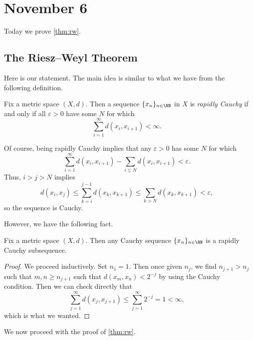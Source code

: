 \documentclass[../notes.tex]{subfiles}
\begin{document}
\section{November 6}

Today we prove \autoref{thm:rw}.

\subsection{The Riesz--Weyl Theorem}
Here is our statement.
\rwthm*
\noindent The main idea is similar to what we have from the following definition.
\begin{definition}
	Fix a metric space $(X,d)$. Then a sequence $\{x_n\}_{n\in\NN}$ in $X$ is \textit{rapidly Cauchy} if and only if all $\varepsilon>0$ have some $N$ for which
	\[\sum_{i=1}^\infty d(x_i,x_{i+1})<\infty.\]
\end{definition}
\begin{remark}
	Of course, being rapidly Cauchy implies that any $\varepsilon>0$ has some $N$ for which
	\[\sum_{i=1}^\infty d(x_i,x_{i+1})-\sum_{i\le N}d(x_i,x_{i+1})<\varepsilon.\]
	Thus, $i>j>N$ implies
	\[d(x_i,x_j)\le\sum_{k=i}^{j-1}d(x_k,x_{k+1})\le\sum_{k>N}d(x_k,x_{k+1})<\varepsilon,\]
	so the sequence is Cauchy.
\end{remark}
However, we have the following fact.
\begin{proposition} \label{prop:cauchy-has-rapidly-cauchy}
	Fix a metric space $(X,d)$. Then any Cauchy sequence $\{x_n\}_{n\in\NN}$ is a rapidly Cauchy subsequence.
\end{proposition}
\begin{proof}
	We proceed inductively. Set $n_1=1$. Then once given $n_j$, we find $n_{j+1}>n_j$ such that $m,n\ge n_{j+1}$ such that $d(x_m,x_n)<2^{-j}$ by using the Cauchy condition. Then we can check directly that
	\[\sum_{j=1}^\infty d(x_j,x_{j+1})\le\sum_{j=1}^\infty2^{-j}=1<\infty,\]
	which is what we wanted.
\end{proof}
We now proceed with the proof of \autoref{thm:rw}.
\end{document}

